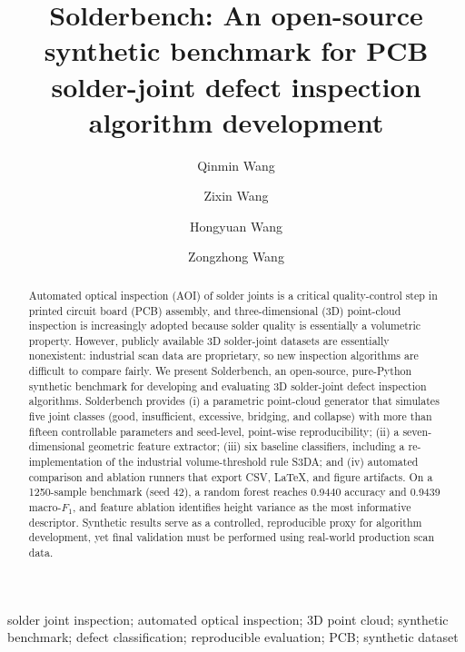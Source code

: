 \documentclass[3p]{elsarticle}
\begin{document}
\begin{frontmatter}
\title{Solderbench: An open-source synthetic benchmark for PCB solder-joint defect inspection algorithm development}
\author[1]{Qinmin Wang}
\author[2]{Zixin Wang}
\author[1]{Hongyuan Wang}
\author[3]{Zongzhong Wang}
\address[1]{School of Computer Science and Artificial Intelligence, Guangdong University of Science and Technology, Dongguan, China}
\address[2]{School of Electronic and Communication Engineering, Tianjin Normal University, Tianjin, China}
\address[3]{School of Electromechanical Engineering, Guangdong University of Technology, Guangzhou, China}
\begin{abstract}
Automated optical inspection (AOI) of solder joints is a critical quality-control step in printed circuit board (PCB) assembly, and three-dimensional (3D) point-cloud inspection is increasingly adopted because solder quality is essentially a volumetric property. However, publicly available 3D solder-joint datasets are essentially nonexistent: industrial scan data are proprietary, so new inspection algorithms are difficult to compare fairly. We present Solderbench, an open-source, pure-Python synthetic benchmark for developing and evaluating 3D solder-joint defect inspection algorithms. Solderbench provides (i) a parametric point-cloud generator that simulates five joint classes (good, insufficient, excessive, bridging, and collapse) with more than fifteen controllable parameters and \mbox{seed-level}, point-wise reproducibility; (ii) a seven-dimensional geometric feature extractor; (iii) six baseline classifiers, including a re-implementation of the industrial volume-threshold rule S3DA; and (iv) automated comparison and ablation runners that export CSV, LaTeX, and figure artifacts. On a 1250-sample benchmark (seed 42), a random forest reaches 0.9440 accuracy and 0.9439 macro-$F_1$, and feature ablation identifies height variance as the most informative descriptor. Synthetic results serve as a controlled, reproducible proxy for algorithm development, yet final validation must be performed using real-world production scan data.
\end{abstract}
\begin{keyword}
solder joint inspection; automated optical inspection; 3D point cloud; synthetic benchmark; defect classification; reproducible evaluation; PCB; synthetic dataset
\end{keyword}
\end{frontmatter}
\end{document}
